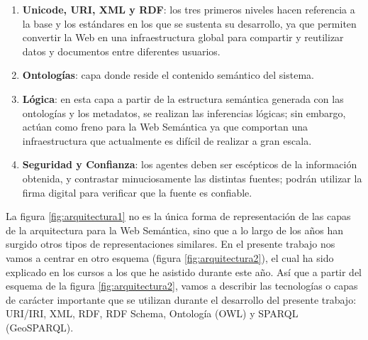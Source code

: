 \begin{enumerate}
	\item \textbf{Unicode, URI, XML y RDF}: los tres primeros niveles hacen referencia a la base y los estándares en los que se sustenta su desarrollo, ya que permiten convertir la Web en una infraestructura global para compartir y reutilizar datos y documentos entre diferentes usuarios.
	
	\item \textbf{Ontologías}: capa donde reside el contenido semántico del sistema. 
	
	\item \textbf{Lógica}: en esta capa a partir de la estructura semántica generada con las ontologías y los metadatos, se realizan las inferencias lógicas; sin embargo, actúan como freno para la Web Semántica ya que comportan una infraestructura que actualmente es difícil de realizar a gran escala. 
	
	\item \textbf{Seguridad y Confianza}: los agentes deben ser escépticos de la información obtenida, y contrastar minuciosamente las distintas fuentes; podrán utilizar la firma digital para verificar que la fuente es confiable. 
\end{enumerate}



La figura \ref{fig:arquitectura1} no es la única forma de representación de las capas de la arquitectura para la Web Semántica, sino que a lo largo de los años han surgido otros tipos de representaciones similares. En el presente trabajo nos vamos a centrar en otro esquema (figura \ref{fig:arquitectura2}), el cual ha sido explicado en los cursos a los que he asistido durante este año. Así que a partir del esquema de la figura \ref{fig:arquitectura2}, vamos a describir las tecnologías o capas de carácter importante que se utilizan durante el desarrollo del presente trabajo: URI/IRI, XML, RDF, RDF Schema, Ontología (OWL) y SPARQL (GeoSPARQL).


